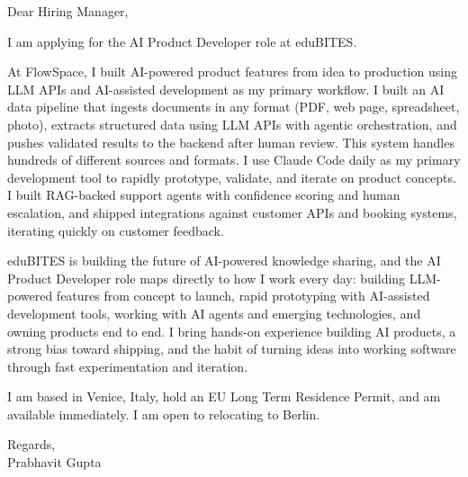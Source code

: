 \documentclass[a4paper,11pt]{article}
\begin{document}
Dear Hiring Manager,

I am applying for the AI Product Developer role at eduBITES.

At FlowSpace, I built AI-powered product features from idea to production using LLM APIs and AI-assisted development as my primary workflow. I built an AI data pipeline that ingests documents in any format (PDF, web page, spreadsheet, photo), extracts structured data using LLM APIs with agentic orchestration, and pushes validated results to the backend after human review. This system handles hundreds of different sources and formats. I use Claude Code daily as my primary development tool to rapidly prototype, validate, and iterate on product concepts. I built RAG-backed support agents with confidence scoring and human escalation, and shipped integrations against customer APIs and booking systems, iterating quickly on customer feedback.

eduBITES is building the future of AI-powered knowledge sharing, and the AI Product Developer role maps directly to how I work every day: building LLM-powered features from concept to launch, rapid prototyping with AI-assisted development tools, working with AI agents and emerging technologies, and owning products end to end. I bring hands-on experience building AI products, a strong bias toward shipping, and the habit of turning ideas into working software through fast experimentation and iteration.

I am based in Venice, Italy, hold an EU Long Term Residence Permit, and am available immediately. I am open to relocating to Berlin.

Regards,\\
Prabhavit Gupta
\end{document}
